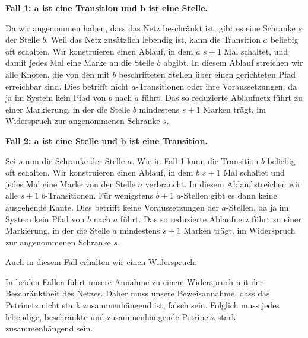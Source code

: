 \vspace{\baselineskip}

\textbf{Fall 1: $\pmb{a}$ ist eine Transition und $\pmb{b}$ ist eine Stelle.}

Da wir angenommen haben, dass das Netz beschränkt ist, gibt es eine Schranke \( s \) der Stelle  \( b \). Weil das Netz zusätzlich lebendig ist, kann die Transition \( a \) beliebig oft schalten.\newline
Wir konstruieren einen Ablauf, in dem \( a \) \( s + 1 \) Mal schaltet, und damit jedes Mal eine Marke an die Stelle \( b \) abgibt. In diesem Ablauf streichen wir alle Knoten, die von den mit $b$ beschrifteten Stellen über einen gerichteten Pfad erreichbar sind. Dies betrifft nicht $a$-Transitionen oder ihre Voraussetzungen, da ja im System kein Pfad von $b$ nach $a$ führt. Das so reduzierte Ablaufnetz führt zu einer Markierung, in der die Stelle $b$ mindestens $s+1$ Marken trägt, im Widerspruch zur angenommenen Schranke $s$.

\vspace{\baselineskip}

\textbf{Fall 2: $\pmb{a}$ ist eine Stelle und $\pmb{b}$ ist eine Transition.}

Sei \( s \) nun die Schranke der Stelle \( a \).\newline
Wie in Fall 1 kann die Transition \( b \) beliebig oft schalten.\newline
Wir konstruieren einen Ablauf, in dem \( b \) \( s + 1 \) Mal schaltet und jedes Mal eine Marke von der Stelle \( a \) verbraucht.\newline
In diesem Ablauf streichen wir alle $s+1$ $b$-Transitionen. Für wenigstens $b+1$ 
\linebreak %
$a$-Stellen gibt es dann keine ausgehende Kante. Dies betrifft keine Voraussetzungen der $a$-Stellen, da ja im System kein Pfad von $b$ nach $a$ führt. Das so reduzierte Ablaufnetz führt zu einer Markierung, in der die Stelle $a$ mindestens $s+1$ Marken trägt, im Widerspruch zur angenommenen Schranke $s$.

Auch in diesem Fall erhalten wir einen Widerspruch.

\vspace{\baselineskip}

In beiden Fällen führt unsere Annahme zu einem Widerspruch mit der Beschränktheit des Netzes. Daher muss unsere Beweisannahme, dass das Petrinetz nicht stark zusammenhängend ist, falsch sein. Folglich muss jedes lebendige, beschränkte und zusammenhängende Petrinetz stark zusammenhängend sein.
